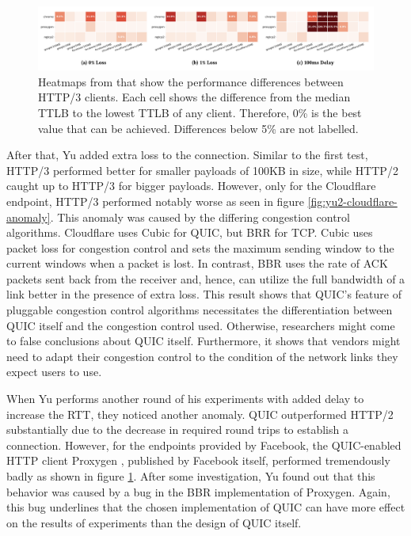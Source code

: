 \documentclass[conference]{IEEEtran}
\begin{document}
\begin{figure}[h]
\includegraphics[width=\textwidth,keepaspectratio]{images/Yu2/HTTP3 Single object benchmarks.png}
\caption{Heatmaps from \cite{Yu2} that show the performance differences between HTTP/3 clients. Each cell shows the difference from the median TTLB to the lowest TTLB of any client. Therefore, 0\% is the best value that can be achieved. Differences below 5\% are not labelled.}
\label{fig:yu2-http3-single-object-benchmark}
\end{figure}

After that, Yu added extra loss to the connection. Similar to the first test, HTTP/3 performed better for smaller payloads of 100KB in size, while HTTP/2 caught up to HTTP/3 for bigger payloads. However, only for the Cloudflare endpoint, HTTP/3 performed notably worse as seen in figure \ref{fig:yu2-cloudflare-anomaly}. This anomaly was caused by the differing congestion control algorithms. Cloudflare uses Cubic for QUIC, but BRR for TCP. Cubic uses packet loss for congestion control and sets the maximum sending window to the current windows when a packet is lost. In contrast, BBR uses the rate of ACK packets sent back from the receiver and, hence, can utilize the full bandwidth of a link better in the presence of extra loss. This result shows that QUIC's feature of pluggable congestion control algorithms necessitates the differentiation between QUIC itself and the congestion control used. Otherwise, researchers might come to false conclusions about QUIC itself. Furthermore, it shows that vendors might need to adapt their congestion control to the condition of the network links they expect users to use.

When Yu performs another round of his experiments with added delay to increase the RTT, they noticed another anomaly. QUIC outperformed HTTP/2 substantially due to the decrease in required round trips to establish a connection. However, for the endpoints provided by Facebook, the QUIC-enabled HTTP client Proxygen \cite{Proxygen}, published by Facebook itself, performed tremendously badly as shown in figure \ref{fig:yu2-http3-single-object-benchmark}. After some investigation, Yu found out that this behavior was caused by a bug in the BBR implementation of Proxygen. Again, this bug underlines that the chosen implementation of QUIC can have more effect on the results of experiments than the design of QUIC itself.
\end{document}
